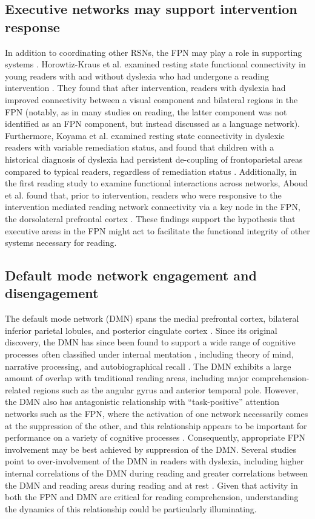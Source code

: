 \subsection{Executive networks may support intervention response}
In addition to coordinating other RSNs, the FPN may play a role in supporting systems \citep{Cole2014}. Horowtiz-Kraus et al. examined resting state functional connectivity in young readers with and without dyslexia who had undergone a reading intervention \citep{HorowitzKraus2015}. They found that after intervention, readers with dyslexia had improved connectivity between a visual component and bilateral regions in the FPN (notably, as in many studies on reading, the latter component was not identified as an FPN component, but instead discussed as a language network). Furthermore, Koyama et al. examined resting state connectivity in dyslexic readers with variable remediation status, and found that children with a historical diagnosis of dyslexia had persistent de-coupling of frontoparietal areas compared to typical readers, regardless of remediation status \citep{Koyama2013}. Additionally, in the first reading study to examine functional interactions across networks, Aboud et al. found that, prior to intervention, readers who were responsive to the intervention mediated reading network connectivity via a key node in the FPN, the dorsolateral prefrontal cortex \citep{Aboud2018}. These findings support the hypothesis that executive areas in the FPN might act to facilitate the functional integrity of other systems necessary for reading.

\subsection{Default mode network engagement and disengagement} 
The default mode network (DMN) spans the medial prefrontal cortex, bilateral inferior parietal lobules, and posterior cingulate cortex \citep{Raichle2001}. Since its original discovery, the DMN has since been found to support a wide range of cognitive processes often classified under internal mentation \citep{Buckner2008}, including theory of mind, narrative processing, and autobiographical recall \citep{AbdulSabur2014}. The DMN exhibits a large amount of overlap with traditional reading areas, including major comprehension-related regions such as the angular gyrus and anterior temporal pole. However, the DMN also has antagonistic relationship with ``task-positive'' attention networks such as the FPN, where the activation of one network necessarily comes at the suppression of the other, and this relationship appears to be important for performance on a variety of cognitive processes \citep{Fox2005, Keller2015}. Consequently, appropriate FPN involvement may be best achieved by suppression of the DMN. Several studies point to over-involvement of the DMN in readers with dyslexia, including higher internal correlations of the DMN during reading \citep{Finn2014} and greater correlations between the DMN and reading areas during reading and at rest \citep{Schurz2014}. Given that activity in both the FPN and DMN are critical for reading comprehension, understanding the dynamics of this relationship could be particularly illuminating.

